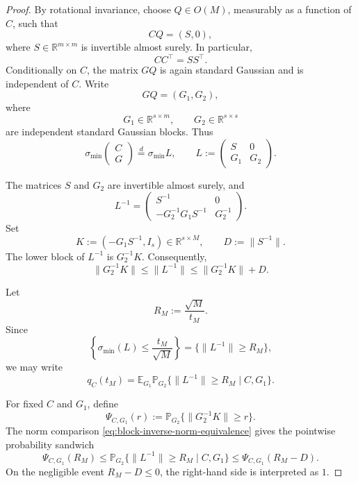 \documentclass[11pt]{article}
\newcommand{\R}{\mathbb R}
\newcommand{\Pbb}{\mathbb P}
\newcommand{\Ebb}{\mathbb E}
\newcommand{\1}{\mathbf 1}
\newcommand{\smin}{\sigma_{\min}}
\begin{document}
\begin{proof}
By rotational invariance, choose \(Q\in O(M)\), measurably as a function of \(C\), such
that
\[
        CQ=(S,0),
\]
where \(S\in\R^{m\times m}\) is invertible almost surely.  In particular,
\[
        CC^\top=SS^\top.
\]
Conditionally on \(C\), the matrix \(GQ\) is again standard Gaussian and is independent of
\(C\).  Write
\[
        GQ=(G_1,G_2),
\]
where
\[
        G_1\in\R^{s\times m},
        \qquad
        G_2\in\R^{s\times s}
\]
are independent standard Gaussian blocks.  Thus
\[
        \smin\begin{pmatrix}C\\G\end{pmatrix}
        \stackrel{d}{=}
        \smin L,
        \qquad
        L:=
        \begin{pmatrix}
        S&0\\
        G_1&G_2
        \end{pmatrix}.
\]

The matrices \(S\) and \(G_2\) are invertible almost surely, and
\[
        L^{-1}
        =
        \begin{pmatrix}
        S^{-1}&0\\
        -G_2^{-1}G_1S^{-1}&G_2^{-1}
        \end{pmatrix}.
\]
Set
\[
        K:=(-G_1S^{-1},I_s)\in\R^{s\times M},
        \qquad
        D:=\|S^{-1}\|.
\]
The lower block of \(L^{-1}\) is \(G_2^{-1}K\).  Consequently,
\begin{equation}
        \|G_2^{-1}K\|
        \le
        \|L^{-1}\|
        \le
        \|G_2^{-1}K\|+D.
        \label{eq:block-inverse-norm-equivalence}
\end{equation}

Let
\[
        R_M:=\frac{\sqrt M}{t_M}.
\]
Since
\[
        \left\{\smin(L)\le\frac{t_M}{\sqrt M}\right\}
        =
        \{\|L^{-1}\|\ge R_M\},
\]
we may write
\[
        q_C(t_M)
        =
        \Ebb_{G_1}
        \Pbb_{G_2}\{\|L^{-1}\|\ge R_M\mid C,G_1\}.
\]

For fixed \(C\) and \(G_1\), define
\[
        \Psi_{C,G_1}(r)
        :=
        \Pbb_{G_2}\{\|G_2^{-1}K\|\ge r\}.
\]
The norm comparison \eqref{eq:block-inverse-norm-equivalence} gives the pointwise
probability sandwich
\begin{equation}
        \Psi_{C,G_1}(R_M)
        \le
        \Pbb_{G_2}\{\|L^{-1}\|\ge R_M\mid C,G_1\}
        \le
        \Psi_{C,G_1}(R_M-D).
        \label{eq:block-inverse-probability-sandwich}
\end{equation}
On the negligible event \(R_M-D\le0\), the right-hand side is interpreted as \(1\).


\end{proof}
\end{document}
